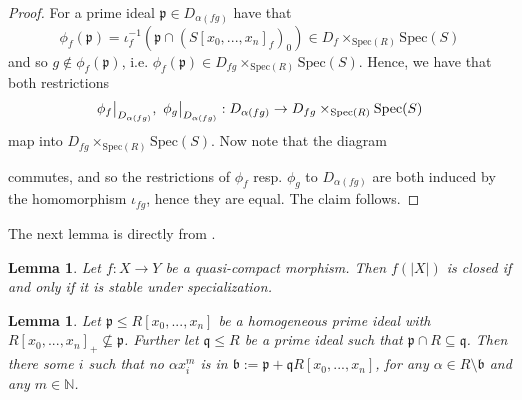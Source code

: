 \documentclass{scrartcl}
\newcommand{\N}{\mathbb{N}}
\newcommand{\p}{\mathfrak{p}}
\newcommand{\q}{\mathfrak{q}}
\renewcommand{\b}{\mathfrak{b}}
\newcommand{\Spec}{\mathrm{Spec}}
\newcommand\restr[2]{{
    \left.\kern-\nulldelimiterspace
    #1
    \vphantom{\big|}
    \right|_{#2}
}}
\newtheorem{lemma}[prop]{Lemma}
\theoremstyle{definition}
\begin{document}
\begin{proof}
    For a prime ideal $\p \in D_{\alpha(fg)}$ have that
    \begin{equation*}
        \phi_f(\p) = \iota_f^{-1}(\p \cap (S[x_0, ..., x_n]_f)_0) \in D_f \times_{\Spec(R)} \Spec(S)
    \end{equation*}
    and so $g \notin \phi_f(\p)$, i.e. $\phi_f(\p) \in D_{fg} \times_{\Spec(R)} \Spec(S)$.
    Hence, we have that both restrictions
    \begin{equation*}
        \restr{\phi_f}{D_{\alpha(fg)}}, \ \restr{\phi_g}{D_{\alpha(fg)}}: D_{\alpha(fg)} \to D_{fg} \times_{\Spec(R)} \Spec(S)
    \end{equation*}
    map into $D_{fg} \times_{\Spec(R)} \Spec(S)$.
    Now note that the diagram
    \begin{center}
    \end{center}
    commutes, and so the restrictions of $\phi_f$ resp. $\phi_g$ to $D_{\alpha(fg)}$ are both induced by the homomorphism $\iota_{fg}$, hence they are equal.
    The claim follows.
\end{proof}
The next lemma is directly from \cite[II.4.5]{hartshorne}.
\begin{lemma}
    \label{prop:im_closed_iff_stable_specialization}
    Let $f: X \to Y$ be a quasi-compact morphism.
    Then $f(|X|)$ is closed if and only if it is stable under specialization.
\end{lemma}
\begin{lemma}
    \label{prop:adding_coeff_ideal_does_not_introduce_irrelevant_ideal}
    Let $\p \leq R[x_0, ..., x_n]$ be a homogeneous prime ideal with $R[x_0, ..., x_n]_+ \not\subseteq \p$.
    Further let $\q \leq R$ be a prime ideal such that $\p \cap R \subseteq \q$.
    Then there some $i$ such that no $\alpha x_i^m$ is in $\b := \p + \q R[x_0, ..., x_n]$, for any $\alpha \in R \setminus \b$ and any $m \in \N$.
\end{lemma}
\end{document}
